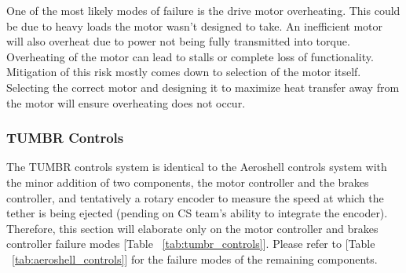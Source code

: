 One of the most likely modes of failure is the drive motor overheating. This could be due to heavy loads the motor wasn’t designed to take. An inefficient motor will also overheat due to power not being fully transmitted into torque. Overheating of the motor can lead to stalls or complete loss of functionality. Mitigation of this risk mostly comes down to selection of the motor itself. Selecting the correct motor and designing it to maximize heat transfer away from the motor will ensure overheating does not occur. 



\subsubsection{\label{sss:tumbr_controls} TUMBR Controls}

\indent\indent The TUMBR controls system is identical to the Aeroshell controls system with the minor addition of two components, the motor controller and the brakes controller, and tentatively a rotary encoder to measure the speed at which the tether is being ejected (pending on CS team's ability to integrate the encoder). Therefore, this section will elaborate only on the motor controller and brakes controller failure modes [Table ~\ref{tab:tumbr_controls}]. Please refer to [Table ~\ref{tab:aeroshell_controls}] for the failure modes of the remaining components.

\begin{table}[H]
\caption{\label{tab:tumbr_controls} TUMBR Controls Failure Modes \& Probabilities}
\centering

\end{table}

